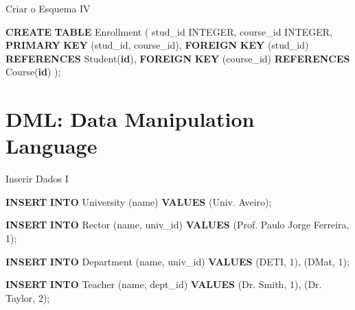 \documentclass[
  ignorenonframetext,
]{beamer}
\newenvironment{Shaded}{}{}
\newcommand{\DataTypeTok}[1]{\textcolor[rgb]{0.56,0.13,0.00}{#1}}
\newcommand{\DecValTok}[1]{\textcolor[rgb]{0.25,0.63,0.44}{#1}}
\newcommand{\KeywordTok}[1]{\textcolor[rgb]{0.00,0.44,0.13}{\textbf{#1}}}
\newcommand{\NormalTok}[1]{#1}
\newcommand{\StringTok}[1]{\textcolor[rgb]{0.25,0.44,0.63}{#1}}
\begin{document}
\begin{frame}[fragile]{Criar o Esquema IV}
\protect{}\label{criar-o-esquema-iv}
\begin{Shaded}
\begin{Highlighting}[]
\KeywordTok{CREATE} \KeywordTok{TABLE}\NormalTok{ Enrollment (}
\NormalTok{    stud\_id }\DataTypeTok{INTEGER}\NormalTok{,}
\NormalTok{    course\_id }\DataTypeTok{INTEGER}\NormalTok{,}
    \KeywordTok{PRIMARY} \KeywordTok{KEY}\NormalTok{ (stud\_id, course\_id),}
    \KeywordTok{FOREIGN} \KeywordTok{KEY}\NormalTok{ (stud\_id) }\KeywordTok{REFERENCES}\NormalTok{ Student(}\KeywordTok{id}\NormalTok{),}
    \KeywordTok{FOREIGN} \KeywordTok{KEY}\NormalTok{ (course\_id) }\KeywordTok{REFERENCES}\NormalTok{ Course(}\KeywordTok{id}\NormalTok{)}
\NormalTok{);}
\end{Highlighting}
\end{Shaded}
\end{frame}

\section{DML: Data Manipulation
Language}\label{dml-data-manipulation-language}

\begin{frame}[fragile]{Inserir Dados I}
\protect{}\label{inserir-dados-i}
\begin{Shaded}
\begin{Highlighting}[]
\KeywordTok{INSERT} \KeywordTok{INTO}\NormalTok{ University (name) }\KeywordTok{VALUES}\NormalTok{ (}\StringTok{\textquotesingle{}Univ. Aveiro\textquotesingle{}}\NormalTok{);}

\KeywordTok{INSERT} \KeywordTok{INTO}\NormalTok{ Rector (name, univ\_id) }\KeywordTok{VALUES}\NormalTok{ (}\StringTok{\textquotesingle{}Prof. Paulo Jorge Ferreira\textquotesingle{}}\NormalTok{, }\DecValTok{1}\NormalTok{);}

\KeywordTok{INSERT} \KeywordTok{INTO}\NormalTok{ Department (name, univ\_id) }\KeywordTok{VALUES}\NormalTok{ (}\StringTok{\textquotesingle{}DETI\textquotesingle{}}\NormalTok{, }\DecValTok{1}\NormalTok{), (}\StringTok{\textquotesingle{}DMat\textquotesingle{}}\NormalTok{, }\DecValTok{1}\NormalTok{);}

\KeywordTok{INSERT} \KeywordTok{INTO}\NormalTok{ Teacher (name, dept\_id) }\KeywordTok{VALUES}\NormalTok{ (}\StringTok{\textquotesingle{}Dr. Smith\textquotesingle{}}\NormalTok{, }\DecValTok{1}\NormalTok{), (}\StringTok{\textquotesingle{}Dr. Taylor\textquotesingle{}}\NormalTok{, }\DecValTok{2}\NormalTok{);}
\end{Highlighting}
\end{Shaded}
\end{frame}
\end{document}
